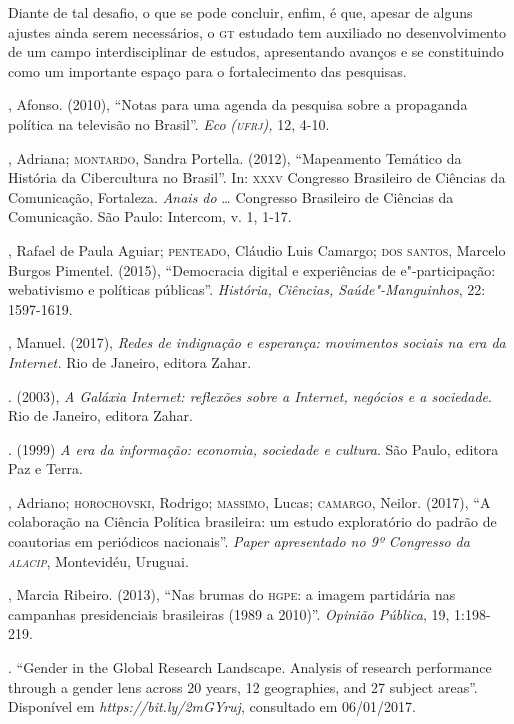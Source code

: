 Diante de tal desafio, o que se pode concluir, enfim, é que, apesar de
alguns ajustes ainda serem necessários, o \textsc{gt} estudado tem auxiliado no
desenvolvimento de um campo interdisciplinar de estudos, apresentando
avanços e se constituindo como um importante espaço para o
fortalecimento das pesquisas.

\begin{bibliohedra}
, Afonso. (2010), ``Notas para uma agenda da pesquisa sobre a
propaganda política na televisão no Brasil''. \emph{Eco} \emph{(\textsc{ufrj}),}
12, 4-10.

, Adriana; \textsc{montardo}, Sandra Portella. (2012), ``Mapeamento
Temático da História da Cibercultura no Brasil''. In: \textsc{xxxv} Congresso
Brasileiro de Ciências da Comunicação, Fortaleza. \emph{Anais do} \ldots{}
Congresso Brasileiro de Ciências da Comunicação. São Paulo: Intercom, v.
1, 1-17.

, Rafael de Paula Aguiar; \textsc{penteado}, Cláudio Luis Camargo; \textsc{dos
santos}, Marcelo Burgos Pimentel. (2015), ``Democracia digital e
experiências de e"-participação: webativismo e políticas públicas''.
\emph{História, Ciências, Saúde"-Manguinhos}, 22: 1597-1619.

, Manuel. (2017), \emph{Redes de indignação e esperança:
movimentos sociais na era da Internet.} Rio de Janeiro, editora Zahar.

\titidem. (2003), \emph{A Galáxia Internet: reflexões sobre a
Internet, negócios e a sociedade}. Rio de Janeiro, editora Zahar.

\titidem. (1999) \emph{A era da informação: economia, sociedade
e cultura}. São Paulo, editora Paz e Terra.

, Adriano; \textsc{horochovski}, Rodrigo; \textsc{massimo}, Lucas; \textsc{camargo}, Neilor.
(2017), ``A colaboração na Ciência Política brasileira: um estudo
exploratório do padrão de coautorias em periódicos nacionais''.
\emph{Paper apresentado no 9º Congresso da \textsc{alacip}}, Montevidéu,
Uruguai.

, Marcia Ribeiro. (2013), ``Nas brumas do \textsc{hgpe}: a imagem partidária
nas campanhas presidenciais brasileiras (1989 a 2010)''. \emph{Opinião
Pública}, 19, 1:198-219.

. ``Gender in the Global Research Landscape. Analysis of
research performance through a gender lens across 20 years, 12
geographies, and 27 subject areas''. Disponível em
\emph{https://bit.ly/2mGYruj}, consultado em 06/01/2017.


\end{bibliohedra}
